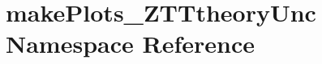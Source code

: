 \hypertarget{namespacemakePlots__ZTTtheoryUnc}{
\section{makePlots\_\-ZTTtheoryUnc Namespace Reference}
\label{namespacemakePlots__ZTTtheoryUnc}
}
